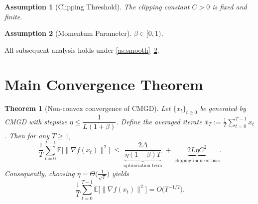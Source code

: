 \documentclass{article}
\newtheorem{theorem}{Theorem}
\newtheorem{assumption}{Assumption}
\begin{document}
\begin{assumption}[Clipping Threshold]\label{as:clip}
The clipping constant $C>0$ is fixed and finite.
\end{assumption}

\begin{assumption}[Momentum Parameter]\label{as:beta}
$\beta\in[0,1)$.
\end{assumption}

All subsequent analysis holds under \ref{as:smooth}–\ref{as:beta}.

\section*{Main Convergence Theorem}
\begin{theorem}[Non‑convex convergence of CMGD]\label{thm:main}
Let $\{x_t\}_{t\ge0}$ be generated by CMGD with stepsize $\eta\le \dfrac{1}{L(1+\beta)}$.
Define the averaged iterate $\bar x_T:=\frac{1}{T}\sum_{t=0}^{T-1}x_t$.
Then for any $T\ge1$,
\[
\frac{1}{T}\sum_{t=0}^{T-1}\mathbb{E}\bigl[\|\nabla f(x_t)\|^2\bigr]
\;\le\;
\underbrace{\frac{2\Delta}{\eta(1-\beta)T}}_{\text{optimization term}}
\;+\;
\underbrace{2L\eta C^2}_{\text{clipping‑induced bias}}.
\tag{1}
\]
Consequently, choosing $\eta = \Theta\!\bigl(\frac{1}{\sqrt{T}}\bigr)$ yields
\[
\frac{1}{T}\sum_{t=0}^{T-1}\mathbb{E}\bigl[\|\nabla f(x_t)\|^2\bigr]=
O\!\bigl(T^{-1/2}\bigr).
\]
\end{theorem}
\end{document}
